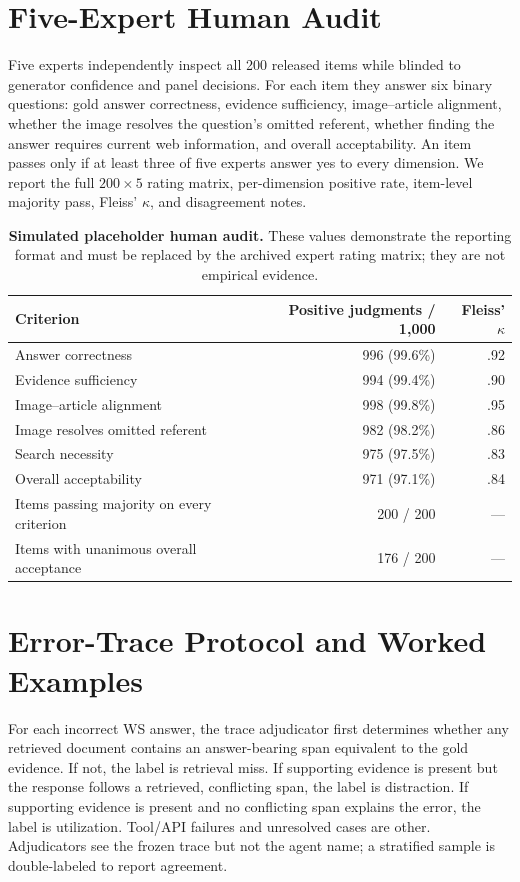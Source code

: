 \documentclass{article}
\newcommand{\placeholder}[1]{\textcolor{blue!65!black}{#1}}
\begin{document}
\section{Five-Expert Human Audit}
\label{app:human}
Five experts independently inspect all 200 released items while blinded to
generator confidence and panel decisions.
For each item they answer six binary questions: gold answer correctness,
evidence sufficiency, image--article alignment, whether the image resolves the
question's omitted referent, whether finding the answer requires current web
information, and overall acceptability.
An item passes only if at least three of five experts answer yes to every
dimension.
We report the full $200\times5$ rating matrix, per-dimension positive rate,
item-level majority pass, Fleiss' $\kappa$, and disagreement notes.

\begin{table}[h]
\centering
\small
\setlength{\tabcolsep}{4pt}
\begin{tabular}{lrr}
\toprule
Criterion & Positive judgments / 1,000 & Fleiss' $\kappa$\\
\midrule
Answer correctness & \placeholder{996 (99.6\%)} & \placeholder{.92}\\
Evidence sufficiency & \placeholder{994 (99.4\%)} & \placeholder{.90}\\
Image--article alignment & \placeholder{998 (99.8\%)} & \placeholder{.95}\\
Image resolves omitted referent & \placeholder{982 (98.2\%)} & \placeholder{.86}\\
Search necessity & \placeholder{975 (97.5\%)} & \placeholder{.83}\\
Overall acceptability & \placeholder{971 (97.1\%)} & \placeholder{.84}\\
\midrule
Items passing majority on every criterion & \placeholder{200 / 200} & ---\\
Items with unanimous overall acceptance & \placeholder{176 / 200} & ---\\
\bottomrule
\end{tabular}
\caption{\textbf{Simulated placeholder human audit.} These values demonstrate
the reporting format and must be replaced by the archived expert rating
matrix; they are not empirical evidence.}
\label{tab:human}
\end{table}

\section{Error-Trace Protocol and Worked Examples}
\label{app:errors}
For each incorrect WS answer, the trace adjudicator first determines whether
any retrieved document contains an answer-bearing span equivalent to the gold
evidence.
If not, the label is retrieval miss.
If supporting evidence is present but the response follows a retrieved,
conflicting span, the label is distraction.
If supporting evidence is present and no conflicting span explains the error,
the label is utilization.
Tool/API failures and unresolved cases are other.
Adjudicators see the frozen trace but not the agent name; a stratified sample is
double-labeled to report agreement.
\end{document}

